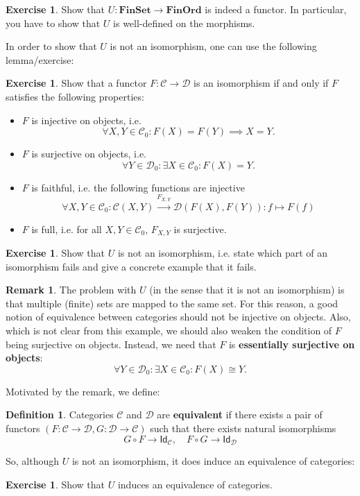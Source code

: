 \documentclass[a4paper,10pt]{scrartcl}
\theoremstyle{plain}
\theoremstyle{definition}
\newtheorem{rem}[thm]{Remark}
\newtheorem{dfn}[thm]{Definition}
\newtheorem{exer}[thm]{Exercise}
\newcommand{\cfont}[1]{\ensuremath{\mathsf{#1}}}
\newcommand{\Cat}[1]{\mathcal{#1}}
\newcommand{\CC}{\Cat{C}}
\newcommand{\DD}{\Cat{D}}
\newcommand{\Catb}[1]{\mathbf{#1}}
\newcommand{\FINSET}{\Catb{FinSet}}
\newcommand{\Ob}[1]{{#1}_0}
\newcommand{\CHom}[3]{{#1}(#2,#3)}
\newcommand{\Id}[1][]{\cfont{Id}_{#1}}
\newcommand{\co}[2]{\ensuremath{#2 \circ #1}}
\begin{document}
\begin{exer} Show that $U: \FINSET\to \Catb{FinOrd}$ is indeed a functor. In particular, you have to show that $U$ is well-defined on the morphisms.
\end{exer}

In order to show that $U$ is not an isomorphism, one can use the following lemma/exercise:
\begin{exer} Show that a functor $F:\CC\to\DD$ is an isomorphism if and only if $F$ satisfies the following properties:
\begin{itemize}
\item $F$ is injective on objects, i.e. 
\[
\forall X,Y\in\Ob{\CC}: F(X) = F(Y) \implies X=Y.
\]
\item $F$ is surjective on objects, i.e. 
\[
\forall Y\in\Ob{\DD}: \exists X\in\Ob{\CC} : F(X) = Y.
\]
\item $F$ is faithful, i.e. the following functions are injective
\[
\forall X,Y\in\Ob{\CC}: \CHom{\CC}{X}{Y} \xrightarrow{F_{X,Y}} \CHom{\DD}{F(X)}{F(Y)} : f\mapsto F(f)
\]
\item $F$ is full, i.e. for all $X,Y\in \Ob{\CC}$, $F_{X,Y}$ is surjective.
\end{itemize}
\end{exer}

\begin{exer} Show that $U$ is not an isomorphism, i.e. state which part of an isomorphism fails and give a concrete example that it fails.
\end{exer}

\begin{rem} The problem with $U$ (in the sense that it is not an isomorphism) is that multiple (finite) sets are mapped to the same set. For this reason, a good notion of equivalence between categories should not be injective on objects. Also, which is not clear from this example, we should also weaken the condition of $F$ being surjective on objects. Instead, we need that $F$ is \textbf{essentially surjective on objects}:
\[
\forall Y\in\Ob{\DD}: \exists X\in\Ob{\CC} : F(X) \cong Y.
\]
\end{rem}
Motivated by the remark, we define:
\begin{dfn} Categories $\CC$ and $\DD$ are \textbf{equivalent} if there exists a pair of functors $(F:\CC\to\DD, G:\DD\to\CC)$ such that there exists natural isomorphisms 
\[
\co{F}{G} \to \Id[\CC], \quad \co{G}{F} \to \Id[\DD]
\]
\end{dfn}

So, although $U$ is not an isomorphism, it does induce an equivalence of categories:
\begin{exer} Show that $U$ induces an equivalence of categories.
\end{exer}
\end{document}
